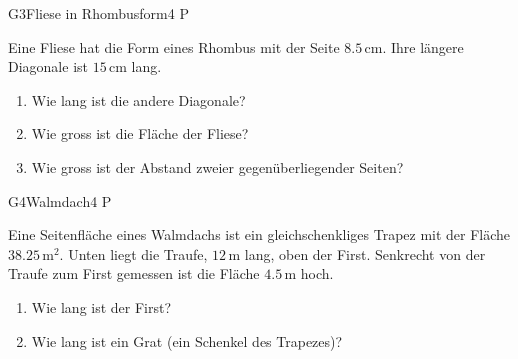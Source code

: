 \documentclass[11pt]{article}
\begin{document}
\begin{lpaufgabe}{G3}{Fliese in Rhombusform}{4 P}
\begin{minipage}[t]{0.56\linewidth}\vspace{0pt}
Eine Fliese hat die Form eines Rhombus mit der Seite $8.5\,\text{cm}$. Ihre längere Diagonale ist $15\,\text{cm}$ lang.
\begin{enumerate}[label=(\alph*),leftmargin=*,itemsep=2pt]
\item Wie lang ist die andere Diagonale?
\item Wie gross ist die Fläche der Fliese?
\item Wie gross ist der Abstand zweier gegenüberliegender Seiten?
\end{enumerate}
\end{minipage}\hfill
\begin{minipage}[t]{0.40\linewidth}\vspace{0pt}\centering
{}
\end{minipage}
\end{lpaufgabe}

\begin{lpaufgabe}{G4}{Walmdach}{4 P}
\begin{minipage}[t]{0.56\linewidth}\vspace{0pt}
Eine Seitenfläche eines Walmdachs ist ein gleichschenkliges Trapez mit der Fläche $38.25\,\text{m}^2$. Unten liegt die
Traufe, $12\,\text{m}$ lang, oben der First. Senkrecht von der Traufe zum First gemessen ist die Fläche $4.5\,\text{m}$ hoch.
\begin{enumerate}[label=(\alph*),leftmargin=*,itemsep=2pt]
\item Wie lang ist der First?
\item Wie lang ist ein Grat (ein Schenkel des Trapezes)?
\end{enumerate}
\end{minipage}\hfill
\begin{minipage}[t]{0.40\linewidth}\vspace{0pt}\centering
{}
\end{minipage}
\end{lpaufgabe}
\end{document}
